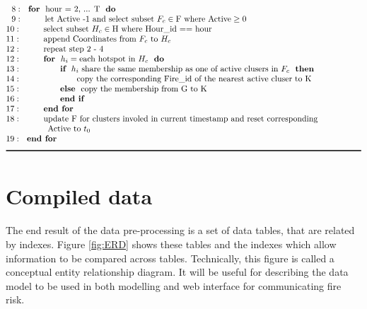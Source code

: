 \documentclass{monashthesis}
\begin{document}
\begin{table}
\begin{align*}
&~~8:~~\textbf{for}~~\text{hour = 2, ... T}~~\textbf{do} \\[-1\jot]
&~~9:~~~~~~~~\text{let Active -1 and select subset }F_c \in \text{F where Active} \geq 0\\[-1\jot]
&10:~~~~~~~~\text{select subset }H_c \in \text{H where Hour\textunderscore id == hour}\\[-1\jot]
&11:~~~~~~~~\text{append Coordinates from }F_c~\text{to}~H_c\\[-1\jot]
&12:~~~~~~~~\text{repeat step 2 - 4}\\[-1\jot]
&12:~~~~~~~~\textbf{for}~~h_i = \text{each hotspot in }H_c~~\textbf{do}\\[-1\jot]
&13:~~~~~~~~~~~~~~\textbf{if}~~h_i~\text{share the same membership as one of active clusers in }F_c~~\textbf{then}\\[-1\jot]
&14:~~~~~~~~~~~~~~~~~~~~\text{copy the corresponding Fire\textunderscore id of the nearest active cluser to K}\\[-1\jot]
&15:~~~~~~~~~~~~~~\textbf{else}~~\text{copy the membership from G to K}\\[-1\jot]
&16:~~~~~~~~~~~~~~\textbf{end if}\\[-1\jot]
&17:~~~~~~~~\textbf{end for}\\[-1\jot]
&18:~~~~~~~~\text{update F for clusters involed in current timestamp and reset corresponding}\\[-1\jot]
&~~~~~~~~~~~~~~~\text{Active to }t_0\\[-1\jot]
&19:~~\textbf{end for}\\[-1\jot]
&\rule{150mm}{0.5mm}
\end{align*}
\end{table}

\section{Compiled data}\label{compiled-data}

The end result of the data pre-processing is a set of data tables, that
are related by indexes. Figure \ref{fig:ERD} shows these tables and the
indexes which allow information to be compared across tables.
Technically, this figure is called a conceptual entity relationship
diagram. It will be useful for describing the data model to be used in
both modelling and web interface for communicating fire risk.
\end{document}
